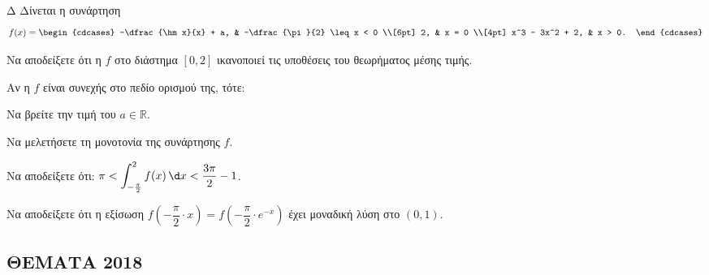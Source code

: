 \begin{thema}{Δ}
Δίνεται η συνάρτηση
\[
f(x) = \begin{cdcases}
-\dfrac{\hm x}{x} + a, & -\dfrac{\pi}{2} \leq x < 0 \\[6pt]
2, & x = 0 \\[4pt]
x^3 - 3x^2 + 2, & x > 0.
\end{cdcases}
\]
\begin{erwthma}
    \item Να αποδείξετε ότι η $f$ στο διάστημα $[0, 2]$ ικανοποιεί τις υποθέσεις του θεωρήματος μέσης τιμής. 
\end{erwthma}

\noindent Αν η $f$ είναι συνεχής στο πεδίο ορισμού της, τότε:

\begin{erwthma}[resume]
    \item Να βρείτε την τιμή του $a \in \mathbb{R}$. 
    \item Να μελετήσετε τη μονοτονία της συνάρτησης $f$. 
    \item Να αποδείξετε ότι: $\pi < \displaystyle\int_{-\frac{\pi}{2}}^{2} f(x)\,\d x < \dfrac{3\pi}{2} - 1$. 
    \item Να αποδείξετε ότι η εξίσωση $f\!\left(-\dfrac{\pi}{2} \cdot x\right) = f\!\left(-\dfrac{\pi}{2} \cdot e^{-x}\right)$ έχει μοναδική λύση στο $(0, 1)$. 
\end{erwthma}
\end{thema}

\subsection{ΘΕΜΑΤΑ 2018}
